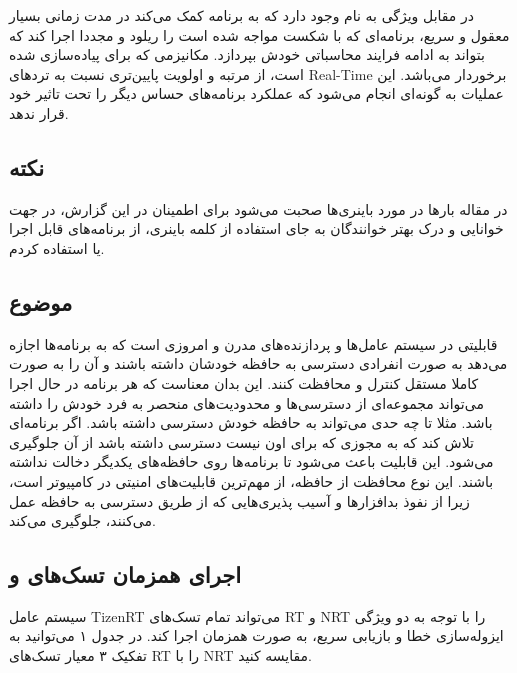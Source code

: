 \documentclass[10pt, a4paper]{article}
\begin{document}
در مقابل ویژگی به نام  وجود دارد که به برنامه کمک می‌کند در
مدت زمانی بسیار معقول و سریع، برنامه‌ای که با شکست مواجه شده‌ است را ریلود و
مجددا اجرا کند که بتواند به ادامه فرایند محاسباتی خودش بپردازد. مکانیزمی که برای
 پیاده‌سازی شده است، از مرتبه و اولویت پایین‌تری نسبت به
ترد‌های Real-Time برخوردار می‌باشد. این عملیات به گونه‌ای انجام می‌شود که عملکرد
برنامه‌های حساس دیگر  را تحت تاثیر خود قرار ندهد.

\subsection*{نکته}

در مقاله بار‌ها در مورد باینری‌ها صحبت می‌شود برای اطمینان در این گزارش، در جهت
خوانایی و درک بهتر خوانندگان به جای استفاده از کلمه باینری، از برنامه‌های قابل
اجرا یا  استفاده کردم.


\subsection{موضوع }

قابلیتی در سیستم عامل‌ها و پردازنده‌های مدرن و امروزی است که به برنامه‌ها اجازه
می‌دهد به صورت انفرادی دسترسی به حافظه خودشان داشته باشند و آن را به صورت کاملا
مستقل کنترل و محافظت کنند. این بدان معناست که هر برنامه در حال اجرا می‌تواند
مجموعه‌ای از دسترسی‌ها و محدودیت‌های منحصر به فرد خودش را داشته باشد.  مثلا تا
چه حدی می‌تواند به حافظه خودش دسترسی داشته باشد. اگر برنامه‌ای تلاش کند که به
مجوزی که برای اون نیست دسترسی داشته باشد از آن جلوگیری می‌شود. این قابلیت باعث
می‌شود تا برنامه‌ها روی  حافظه‌های یکدیگر دخالت نداشته باشند. این نوع محافظت از
حافظه، از مهم‌ترین قابلیت‌های امنیتی در کامپیوتر است، زیرا از نفوذ بدافزار‌ها و
آسیب پذیری‌هایی که از طریق دسترسی به حافظه عمل می‌کنند، جلوگیری می‌کند.

\subsection{اجرای همزمان تسک‌های  و }

سیستم عامل TizenRT می‌تواند تمام تسک‌های RT و NRT را با توجه به دو ویژگی
ایزوله‌سازی خطا و بازیابی سریع، به صورت همزمان اجرا کند. در جدول ۱ می‌توانید به
تفکیک ۳ معیار تسک‌های RT را با NRT مقایسه کنید.
\end{document}
